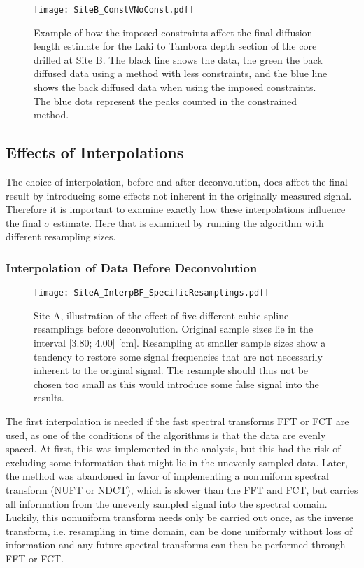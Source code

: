 \documentclass[../../CompleteThesis2/Complete_2ndDraft]{subfiles}
\begin{document}
\begin{figure}[!htb]
	\centering
	\texttt{[image: SiteB\_ConstVNoConst.pdf]}
	\caption[Site B constrained vs. unconstrained]{\small Example of how the imposed constraints affect the final diffusion length estimate for the Laki to Tambora depth section of the core drilled at Site B. The black line shows the data, the green the back diffused data using a method with less constraints, and the blue line shows the back diffused data when using the imposed constraints. The blue dots represent the peaks counted in the constrained method.}
	\label{fig:SiteB_ConstVNoConst}
\end{figure}


\subsection[Effects of Interpolations]{Effects of Interpolations}
\label{Subsec:METH_Interpolation}
The choice of interpolation, before and after deconvolution, does affect the final result by introducing some effects not inherent in the originally measured signal. Therefore it is important to examine exactly how these interpolations influence the final $\sigma$ estimate. Here that is examined by running the algorithm with different resampling sizes. 

\subsubsection[Interpolation 1]{Interpolation of Data Before Deconvolution}
\label{Subsubsec:METH_Interpolation_BFdecon}
\begin{figure}[!htb]
	\centering
	\texttt{[image: SiteA\_InterpBF\_SpecificResamplings.pdf]}
	\caption[BD data, Site A, resamplings before deconvolution]{\small Site A, illustration of the effect of five different cubic spline resamplings before deconvolution. Original sample sizes lie in the interval [3.80; 4.00] [cm]. Resampling at smaller sample sizes show a tendency to restore some signal frequencies that are not necessarily inherent to the original signal. The resample should thus not be chosen too small as this would introduce some false signal into the results.}
	\label{Fig:COMPMETH_SiteA_interpBF_SpecificSamplings}
\end{figure}

The first interpolation is needed if the fast spectral transforms FFT or FCT are used, as one of the conditions of the algorithms is that the data are evenly spaced. At first, this was implemented in the analysis, but this had the risk of excluding some information that might lie in the unevenly sampled data. Later, the method was abandoned in favor of implementing a nonuniform spectral transform (NUFT or NDCT), which is slower than the FFT and FCT, but carries all information from the unevenly sampled signal into the spectral domain. Luckily, this nonuniform transform needs only be carried out once, as the inverse transform, i.e. resampling in time domain, can be done uniformly without loss of information and any future spectral transforms can then be performed through FFT or FCT.
\end{document}
